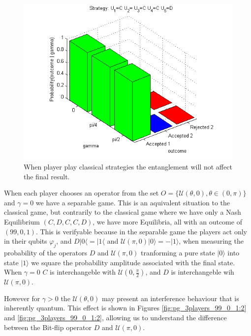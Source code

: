 \begin{figure}[h!]
\centering 
\includegraphics[scale=0.80]{Figures/1.5qubit/CDCCD.png}
\caption{When player play classical strategies the entanglement will not affect the final result. }
\label{fig:pg_3players_99_0_1}
\end{figure}

When each player chooses an operator from the set $O = \{ \mathcal{U} ( \theta , 0) , \theta \in (0, \pi) \}$ and $\gamma=0$ we have a separable game. This is an aquivalent situation to the classical game, but contrarily to the classical game where we have only a Nash Equilibrium $(C,D,C,C,D)$, we have more Equilibria, all with an outcome of $(99, 0, 1)$. This is verifyable because in the separable game the players act only in their qubits $\varphi_{j}$, and $D\vert 0\langle =\vert 1 \langle$ and $\mathcal{U}( \pi, 0) \vert 0 \rangle = - \vert 1 \rangle $, when measuring the probability of the operators $D$ and $\mathcal{U}( \pi, 0)$ tranforming a pure state $\vert 0 \rangle$ into state $\vert 1 \rangle$ we square the probability amplitude associated with the final state. When $\gamma = 0$  $C$ is interchangeble with $\mathcal{U}(0, \frac{\pi}{2})$, and $D$ is interchangeble wih $\mathcal{U}( \pi, 0)$.

However for $\gamma >0$ the $\mathcal{U} ( \theta , 0)$ may present an interference behaviour that is inherently quantum. This effect is shown in Figures \ref{fig:pg_3players_99_0_1:2} and \ref{fig:pg_3players_99_0_1:2}, allowing us to understand the difference between the Bit-flip operator $D$ and $\mathcal{U} ( \pi , 0)$.



